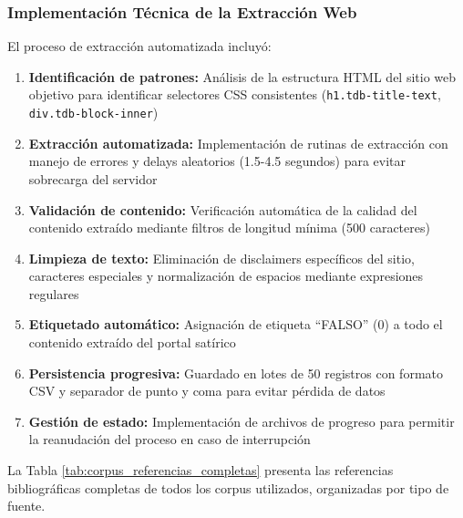 \subsubsection{Implementación Técnica de la Extracción Web}

El proceso de extracción automatizada incluyó:

\begin{enumerate}
    \item \textbf{Identificación de patrones:} Análisis de la estructura HTML del sitio web objetivo para identificar selectores CSS consistentes (\texttt{h1.tdb-title-text}, \texttt{div.tdb-block-inner})
    \item \textbf{Extracción automatizada:} Implementación de rutinas de extracción con manejo de errores y delays aleatorios (1.5-4.5 segundos) para evitar sobrecarga del servidor
    \item \textbf{Validación de contenido:} Verificación automática de la calidad del contenido extraído mediante filtros de longitud mínima (500 caracteres)
    \item \textbf{Limpieza de texto:} Eliminación de disclaimers específicos del sitio, caracteres especiales y normalización de espacios mediante expresiones regulares
    \item \textbf{Etiquetado automático:} Asignación de etiqueta ``FALSO'' (0) a todo el contenido extraído del portal satírico
    \item \textbf{Persistencia progresiva:} Guardado en lotes de 50 registros con formato CSV y separador de punto y coma para evitar pérdida de datos
    \item \textbf{Gestión de estado:} Implementación de archivos de progreso para permitir la reanudación del proceso en caso de interrupción
\end{enumerate}

La Tabla \ref{tab:corpus_referencias_completas} presenta las referencias bibliográficas completas de todos los corpus utilizados, organizadas por tipo de fuente.

